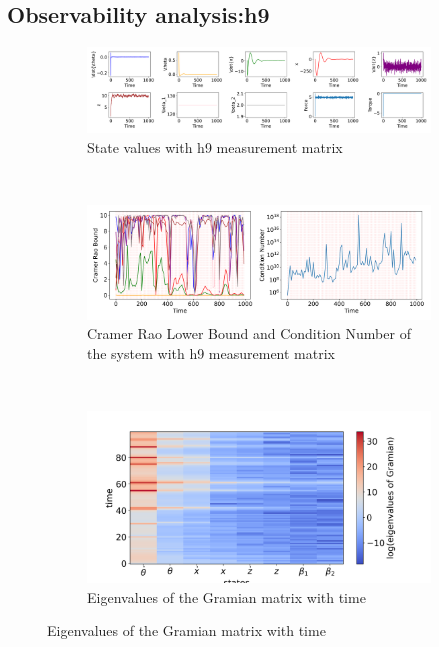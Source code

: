 \documentclass[12pt]{article}
\begin{document}
\subsection*{Observability analysis:h9}
\begin{figure}[H]
    \centering
    \begin{subfigure}[t]{\textwidth}
        \centering
        \includegraphics[width=15cm]{figures/states_with_noisy_sinusoidal_x_and_h9.png}
        \caption{State values with h9 measurement matrix}
        \label{supfig:09a}
    \end{subfigure}
    \\
    \begin{subfigure}[t]{\textwidth}
        \centering
        \includegraphics[width=15cm]{figures/crb_and_cn_with_noisy_sinusoidal_x_and_h9.png}
        \caption{Cramer Rao Lower Bound and Condition Number of the system with h9 measurement matrix}
        \label{supfig:09b}
    \end{subfigure}
    \\
    \begin{subfigure}[t]{\textwidth}
        \centering
        \includegraphics[width=15cm]{figures/gramian_eigenvalues_with_noisy_sinusoidal_x_and_h9.png}
        \caption{Eigenvalues of the Gramian matrix with time}
        \label{supfig:09c}
    \end{subfigure}
\end{figure}
\end{document}
